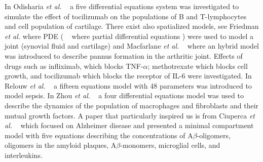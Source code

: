 \documentclass[a4paper, 12pt]{article}
\providecommand{\DIFaddtex}[1]{{\protect\color{blue} \sf #1}} %
\providecommand{\DIFdeltex}[1]{{\protect\color{red} \scriptsize #1}} %
\providecommand{\DIFaddbegin}{} %
\providecommand{\DIFaddend}{} %
\providecommand{\DIFdelbegin}{} %
\providecommand{\DIFdelend}{} %
\providecommand{\DIFadd}[1]{\texorpdfstring{\DIFaddtex{#1}}{#1}} %
\providecommand{\DIFdel}[1]{\texorpdfstring{\DIFdeltex{#1}}{}} %
\begin{document}
In Odisharia \textit{et al.}\DIFaddbegin \DIFadd{~}\DIFaddend \cite{jaiani2019} a five differential equations system was investigated to simulate the effect of tocilizumab on the populations of B and T-lymphocytes and cell population of cartilage.  
There exist also spatialized models, see Friedman \textit{et al.}\DIFdelbegin \DIFdel{\cite{friedman} where PDE (}\DIFdelend \DIFaddbegin \DIFadd{~\cite{friedman} where }\DIFaddend partial differential equations \DIFdelbegin \DIFdel{) }\DIFdelend were used to model a joint (synovial fluid and cartilage) and  Macfarlane \textit{et al.}\DIFaddbegin \DIFadd{~}\DIFaddend \cite{macfarlane2022}
 where an hybrid model was introduced to describe pannus formation in the arthritic joint.
Effects of drugs such as inﬂiximab, which blocks TNF-$\alpha$; methotrexate
which blocks cell growth, and tocilizumab
which blocks the receptor of IL-6 were investigated.
In Relouw \textit{et al.}\DIFaddbegin \DIFadd{~}\DIFaddend \cite{relouw} a fifteen equations model with 48 parameters was introduced to model sepsis.
In Zhou \textit{et al.}\DIFaddbegin \DIFadd{~}\DIFaddend \cite{zhou2018} a four differential equations model was used to describe the dynamics of the population of macrophages and fibroblasts  and their mutual growth factors.
A paper that particularly inspired us 
is from Ciuperca \textit{et al.}\DIFaddbegin \DIFadd{~}\DIFaddend \cite{torres2024} which focused on Alzheimer disease and presented a minimal compartment model with  five equations describing the concentrations of 
 A$\beta$-oligomers,
oligomers in the amyloid plaques,
A$\beta$-monomers,
microglial cells, and
interleukins.
\end{document}
